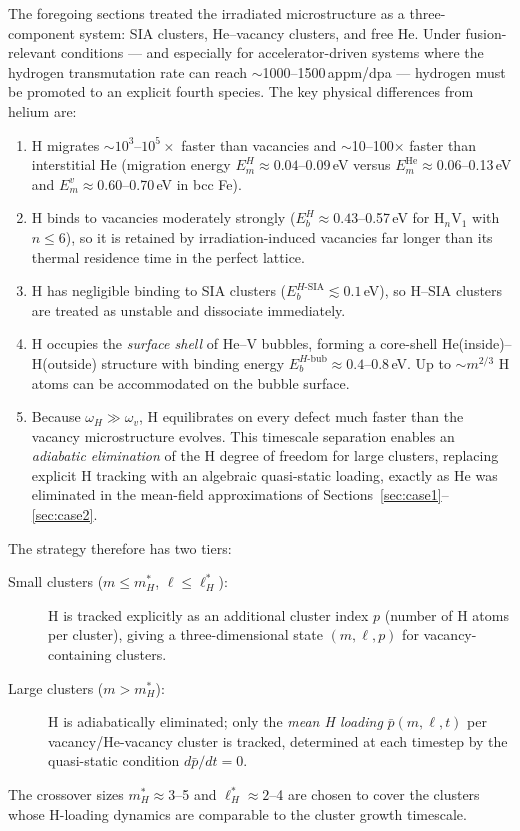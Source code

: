 The foregoing sections treated the irradiated microstructure as a
three-component system: SIA clusters, He--vacancy clusters, and free He.
Under fusion-relevant conditions --- and especially for accelerator-driven
systems where the hydrogen transmutation rate can reach
$\sim$1000--1500\,appm/dpa --- hydrogen must be promoted to an explicit
fourth species.  The key physical differences from helium are:
\begin{enumerate}
  \item H migrates $\sim10^3$--$10^5\times$ faster than vacancies and
        $\sim$10--100$\times$ faster than interstitial He (migration
        energy $E_m^H \approx 0.04$--0.09\,eV versus
        $E_m^{\mathrm{He}} \approx 0.06$--0.13\,eV and
        $E_m^v \approx 0.60$--0.70\,eV in bcc Fe).
  \item H binds to vacancies moderately strongly ($E_b^H \approx
        0.43$--0.57\,eV for H$_n$V$_1$ with $n \leq 6$), so it is
        retained by irradiation-induced vacancies far longer than its
        thermal residence time in the perfect lattice.
  \item H has negligible binding to SIA clusters
        ($E_b^{H\text{-SIA}} \lesssim 0.1$\,eV), so H--SIA clusters
        are treated as unstable and dissociate immediately.
  \item H occupies the \emph{surface shell} of He--V bubbles, forming a
        core-shell He(inside)--H(outside) structure with binding energy
        $E_b^{H\text{-bub}} \approx 0.4$--0.8\,eV.  Up to $\sim m^{2/3}$
        H atoms can be accommodated on the bubble surface.
  \item Because $\omega_H \gg \omega_v$, H equilibrates on every defect
        much faster than the vacancy microstructure evolves.  This
        timescale separation enables an \emph{adiabatic elimination} of
        the H degree of freedom for large clusters, replacing explicit H
        tracking with an algebraic quasi-static loading, exactly as He
        was eliminated in the mean-field approximations of
        Sections~\ref{sec:case1}--\ref{sec:case2}.
\end{enumerate}

The strategy therefore has two tiers:
\begin{description}
  \item[Small clusters ($m \leq m_H^*$, $\ell \leq \ell_H^*$):]
        H is tracked explicitly as an additional cluster index $p$ (number
        of H atoms per cluster), giving a three-dimensional state
        $(m, \ell, p)$ for vacancy-containing clusters.
  \item[Large clusters ($m > m_H^*$):]
        H is adiabatically eliminated; only the \emph{mean H loading}
        $\bar{p}(m,\ell,t)$ per vacancy/He-vacancy cluster is tracked,
        determined at each timestep by the quasi-static condition
        $d\bar{p}/dt = 0$.
\end{description}
The crossover sizes $m_H^* \approx 3$--5 and $\ell_H^* \approx 2$--4
are chosen to cover the clusters whose H-loading dynamics are comparable
to the cluster growth timescale.

